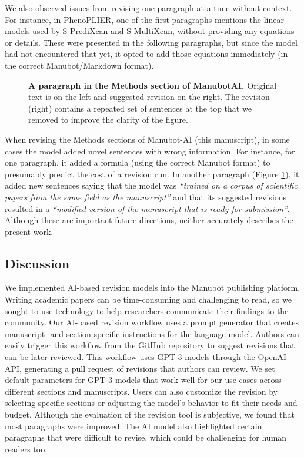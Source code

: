\documentclass[
]{article}
\begin{document}
We also observed issues from revising one paragraph at a time without context.
For instance, in PhenoPLIER, one of the first paragraphs mentions the linear models used by S-PrediXcan and S-MultiXcan, without providing any equations or details.
These were presented in the following paragraphs, but since the model had not encountered that yet, it opted to add those equations immediately (in the correct Manubot/Markdown format).

\begin{figure}
\hypertarget{fig:methods:manubotai}{%
\centering

\caption{\textbf{A paragraph in the Methods section of ManubotAI.}
Original text is on the left and suggested revision on the right.
The revision (right) contains a repeated set of sentences at the top that we removed to improve the clarity of the figure.}\label{fig:methods:manubotai}
}
\end{figure}

When revising the Methods sections of Manubot-AI (this manuscript), in some cases the model added novel sentences with wrong information.
For instance, for one paragraph, it added a formula (using the correct Manubot format) to presumably predict the cost of a revision run.
In another paragraph (Figure \ref{fig:methods:manubotai}), it added new sentences saying that the model was \emph{``trained on a corpus of scientific papers from the same field as the manuscript''} and that its suggested revisions resulted in a \emph{``modified version of the manuscript that is ready for submission''}.
Although these are important future directions, neither accurately describes the present work.

\hypertarget{discussion}{%
\subsection{Discussion}\label{discussion}}

We implemented AI-based revision models into the Manubot publishing platform.
Writing academic papers can be time-consuming and challenging to read, so we sought to use technology to help researchers communicate their findings to the community.
Our AI-based revision workflow uses a prompt generator that creates manuscript- and section-specific instructions for the language model.
Authors can easily trigger this workflow from the GitHub repository to suggest revisions that can be later reviewed.
This workflow uses GPT-3 models through the OpenAI API, generating a pull request of revisions that authors can review.
We set default parameters for GPT-3 models that work well for our use cases across different sections and manuscripts.
Users can also customize the revision by selecting specific sections or adjusting the model's behavior to fit their needs and budget.
Although the evaluation of the revision tool is subjective, we found that most paragraphs were improved.
The AI model also highlighted certain paragraphs that were difficult to revise, which could be challenging for human readers too.
\end{document}
